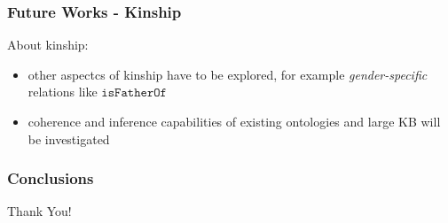 \documentclass[8pt]{beamer}
\begin{document}
\begin{frame}
\frametitle{Future Works - Kinship}
About kinship:
\begin{itemize}
 \item other aspectcs of kinship have to be explored, for example \emph{gender-specific}
  relations like $\mathtt{isFatherOf}$
 \item coherence and inference capabilities of existing ontologies and large KB will be investigated
\end{itemize}
\vspace{\baselineskip}

\end{frame}

\begin{frame}
\frametitle{Conclusions}
  \vspace{1.5cm}
  \begin{center}
  \Large{Thank You!}
   
  \end{center}
\end{frame}
\end{document}

